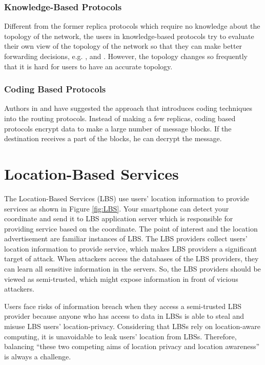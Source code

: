 \subsubsection{  Knowledge-Based Protocols}

\noindent Different from the former replica protocols which require no knowledge about the topology of the network, the users in knowledge-based protocols try to evaluate their own view of the topology of the network so that they can make better forwarding decisions, e.g. \cite{C36}, \cite{C38} and \cite{C39}. However, the topology changes so frequently that it is hard for users to have an accurate topology.


\subsubsection{ Coding Based Protocols}

\noindent Authors in \cite {C12} and \cite {C13} have suggested the approach that introduces coding techniques into the routing protocols. Instead of making a few replicas, coding based protocols encrypt data to make a large number of message blocks. If the destination receives a part of the blocks, he can decrypt the message.

\section{ Location-Based Services}

\noindent The Location-Based Services (LBS) use users' location information to provide services as shown in Figure \ref{fig:LBS}. Your smartphone can detect your coordinate and send it to LBS application server which is responsible for providing service based on the coordinate. The point of interest and the location advertisement are familiar instances of LBS. The LBS providers collect users' location information to provide service, which makes LBS providers a significant target of attack. When attackers access the databases of the LBS providers, they can learn all sensitive information in the servers. So, the LBS providers should be viewed as semi-trusted, which might expose information in front of vicious attackers.

Users face risks of information breach when they access a semi-trusted LBS provider because anyone who has access to data in LBSs is able to steal and misuse LBS users' location-privacy. Considering that LBSs rely on location-aware computing, it is unavoidable to leak users' location from LBSs. Therefore, balancing ``these two competing aims of location privacy and location awareness'' \cite {C20} is always a challenge.

